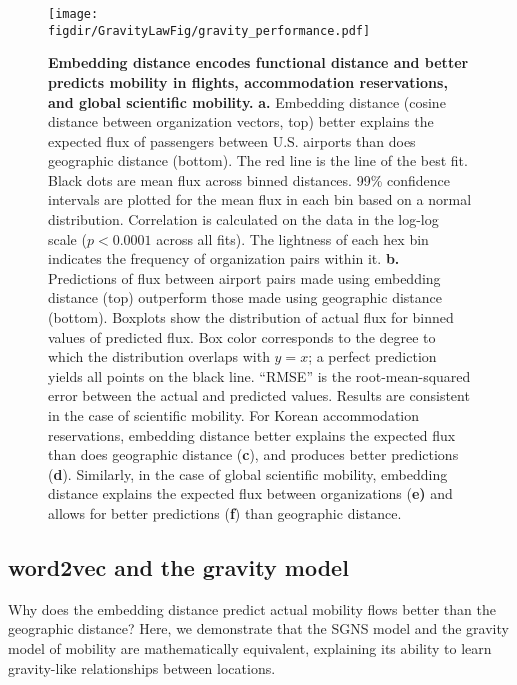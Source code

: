 \documentclass[12pt]{article} %
\def\figdir{../Figs}
\begin{document}
%
%
\begin{figure}[h!]
	\centering
	\texttt{[image: \\figdir/GravityLawFig/gravity\_performance.pdf]}
	\caption{
		\textbf{Embedding distance encodes functional distance and better predicts mobility in flights, accommodation reservations, and global scientific mobility.}
		\textbf{a.} Embedding distance (cosine distance between organization vectors, top) better explains the expected flux of passengers between U.S. airports than does geographic distance (bottom).
		The red line is the line of the best fit.
		Black dots are mean flux across binned distances.
		99\% confidence intervals are plotted for the mean flux in each bin based on a normal distribution.
		Correlation is calculated on the data in the log-log scale ($p < 0.0001$ across all fits).
		The lightness of each hex bin indicates the frequency of organization pairs within it.
		\textbf{b.} Predictions of flux between airport pairs made using embedding distance (top) outperform those made using geographic distance (bottom).
		Boxplots show the distribution of actual flux for binned values of predicted flux.
		Box color corresponds to the degree to which the distribution overlaps with $y = x$;
		a perfect prediction yields all points on the black line.
		``RMSE'' is the root-mean-squared error between the actual and predicted values.
		Results are consistent in the case of scientific mobility.
		For Korean accommodation reservations, embedding distance better explains the expected flux than does geographic distance (\textbf{c}), and produces better predictions (\textbf{d}).
		Similarly, in the case of global scientific mobility, embedding distance explains the expected flux between organizations (\textbf{e)} and allows for better predictions (\textbf{f}) than geographic distance.
	}
	\label{fig:gravity_performance}
\end{figure}



\subsection*{word2vec and the gravity model}

Why does the embedding distance predict actual mobility flows better than the geographic distance?
Here, we demonstrate that the SGNS model and the gravity model of mobility are mathematically equivalent, explaining its ability to learn gravity-like relationships between locations. 
\end{document}
